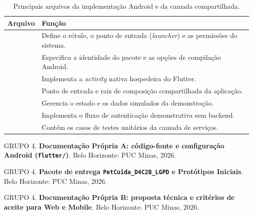 \documentclass[12pt,a4paper]{article}
\begin{document}
\begin{table}[H]
\centering
\caption{Principais arquivos da implementação Android e da camada compartilhada.}
\label{tab:arquivos_android}
\begin{tabularx}{\textwidth}{>{\raggedright\arraybackslash}p{6.8cm}Y}
\toprule
\textbf{Arquivo} & \textbf{Função}\\
\midrule
{} & Define o rótulo, o ponto de entrada (\textit{launcher}) e as permissões do sistema.\\
\addlinespace[4pt]
 & Especifica a identidade do pacote e as opções de compilação Android.\\
\addlinespace[4pt]
 & Implementa a \textit{activity} nativa hospedeira do Flutter.\\
\addlinespace[4pt]
 & Ponto de entrada e raiz de composição compartilhada da aplicação.\\
\addlinespace[4pt]
 & Gerencia o estado e os dados simulados da demonstração.\\
\addlinespace[4pt]
 & Implementa o fluxo de autenticação demonstrativa sem backend.\\
\addlinespace[4pt]
 & Contém os casos de testes unitários da camada de serviços.\\
\bottomrule
\end{tabularx}
\end{table}


\begin{thebibliography}{9}
GRUPO 4. \textbf{Documentação Própria A: código-fonte e configuração Android (\texttt{flutter/})}. Belo Horizonte: PUC Minas, 2026.

GRUPO 4. \textbf{Pacote de entrega \texttt{PetCuida\_D4C2B\_LGPD} e Protótipos Iniciais}. Belo Horizonte: PUC Minas, 2026.

GRUPO 4. \textbf{Documentação Própria B: proposta técnica e critérios de aceite para Web e Mobile}. Belo Horizonte: PUC Minas, 2026.
\end{thebibliography}
\end{document}
